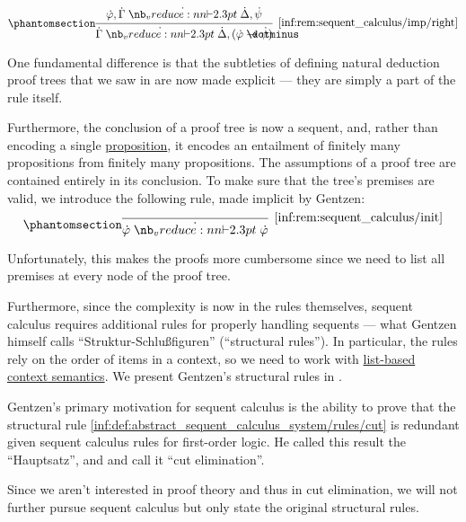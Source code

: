 \begin{remark}
\begin{paracol}{2}
    \begin{rightcolumn}
      \ParacolAlignmentHack
      \begin{equation}\taglabel[\ensuremath{ \rightarrow_R }]{inf:rem:sequent_calculus/imp/right}
        \begin{prooftree}
          \hypo{ \syn\varphi, \syn\Gamma \synvdash \syn\Delta, \syn\psi }
          \infer1[\ref{inf:rem:sequent_calculus/imp/right}]{ \syn\Gamma \synvdash \syn\Delta, (\syn\varphi \synimplies \syn\psi) }
        \end{prooftree}
      \end{equation}
    \end{rightcolumn}
  \end{paracol}

  One fundamental difference is that the subtleties of defining natural deduction proof trees that we saw in  are now made explicit --- they are simply a part of the rule itself.

  Furthermore, the conclusion of a proof tree is now a sequent, and, rather than encoding a single \hyperref[con:proposition]{proposition}, it encodes an entailment of finitely many propositions from finitely many propositions. The assumptions of a proof tree are contained entirely in its conclusion. To make sure that the tree's premises are valid, we introduce the following rule, made implicit by Gentzen:
  \begin{equation*}\taglabel[\ensuremath{ \logic{Init} }]{inf:rem:sequent_calculus/init}
    \begin{prooftree}
      \infer0[\ref{inf:rem:sequent_calculus/init}]{ \syn\varphi \synvdash \syn\varphi }.
    \end{prooftree}
  \end{equation*}

  Unfortunately, this makes the proofs more cumbersome since we need to list all premises at every node of the proof tree.

  Furthermore, since the complexity is now in the rules themselves, sequent calculus requires additional rules for properly handling sequents --- what Gentzen himself calls \enquote{Struktur-Schlu\ss{}figuren} (\enquote{structural rules}). In particular, the rules rely on the order of items in a context, so we need to work with \hyperref[def:logical_context_semantics]{list-based context semantics}. We present Gentzen's structural rules in .

  Gentzen's primary motivation for sequent calculus is the ability to prove that the structural rule \ref{inf:def:abstract_sequent_calculus_system/rules/cut} is redundant given sequent calculus rules for first-order logic. He called this result the \enquote{Hauptsatz}, and  and  call it \enquote{cut elimination}.

  Since we aren't interested in proof theory and thus in cut elimination, we will not further pursue sequent calculus but only state the original structural rules.
\end{remark}

